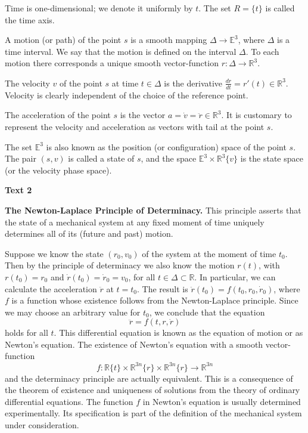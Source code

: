 \documentclass[a4paper]{article}
\newcommand{\ESect}[1]{\medskip\par{\large \textbf{#1}}\par}
\begin{document}
Time is one-dimensional; we denote it uniformly by $t$. The set $R = \{ t \}$ is called the time axis.

A motion (or path) of the point $s$ is a smooth mapping $\Delta \rightarrow \mathbb{E}^3$, where $\Delta$ is a time interval.
We say that the motion is defined on the interval $\Delta$. To each motion there corresponds a unique smooth vector-function
$r: \Delta \rightarrow \mathbb{R}^3$.

The velocity $v$ of the point $s$ at time $t \in \Delta$ is the derivative $\frac{dr}{dt} = r'(t) \in \mathbb{R}^3$. Velocity is
clearly independent of the choice of the reference point.

The acceleration of the point $s$ is the vector $a=\dot v=\ddot r \in \mathbb{R}^3$. It is customary to represent the velocity
and acceleration as vectors with tail at the point $s$.

The set $\mathbb{E}^3$ is also known as the position (or configuration) space of the point $s$. The pair $(s, v)$ is called a
state of $s$, and the space $\mathbb{E}^3 \times \mathbb{R}^3\{v\}$ is the state space (or the velocity phase space).

\ESect{Text 2}
\textbf{The Newton-Laplace Principle of Determinacy.} This principle asserts that the state of a mechanical system at any
fixed moment of time uniquely determines all of its (future and past) motion.

Suppose we know the state $(r_0,v_0)$ of the system at the moment of time $t_0$. Then by the principle of determinacy we also
know the motion $r(t)$, with $r(t_0)=r_0$ and $\dot r(t_0) = \dot r_0 = v_0$, for all $t \in \Delta \subset \mathbb{R}$. In
particular, we can calculate the acceleration $\ddot r$ at $t = t_0$. The result is $\ddot r(t_0)=f(t_0,r_0,\dot r_0)$, where
$f$ is a function whose existence follows from the Newton-Laplace principle. Since we may choose an arbitrary value for
$t_0$, we conclude that the equation
$$\ddot r = f(t, r, \dot r)$$
holds for all $t$. This differential equation is known as the equation of motion or as Newton's equation. The existence of
Newton's equation with a smooth vector-function
$$f: \mathbb{R}\{t\}\times\mathbb{R}^{3n}\{r\}\times\mathbb{R}^{3n}\{r\} \rightarrow \mathbb{R}^{3n}$$
and the determinacy principle are actually equivalent. This is a consequence of the theorem of existence and uniqueness
of solutions from the theory of ordinary differential equations. The function $f$ in Newton's equation is usually determined
experimentally. Its specification is part of the definition of the mechanical system under consideration.
\end{document}
